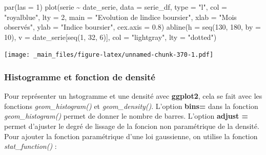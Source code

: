 \documentclass[
]{book}
\newenvironment{Shaded}{\begin{snugshade}}{\end{snugshade}}
\newcommand{\AttributeTok}[1]{\textcolor[rgb]{0.77,0.63,0.00}{#1}}
\newcommand{\DecValTok}[1]{\textcolor[rgb]{0.00,0.00,0.81}{#1}}
\newcommand{\FloatTok}[1]{\textcolor[rgb]{0.00,0.00,0.81}{#1}}
\newcommand{\FunctionTok}[1]{\textcolor[rgb]{0.00,0.00,0.00}{#1}}
\newcommand{\NormalTok}[1]{#1}
\newcommand{\SpecialCharTok}[1]{\textcolor[rgb]{0.00,0.00,0.00}{#1}}
\newcommand{\StringTok}[1]{\textcolor[rgb]{0.31,0.60,0.02}{#1}}
\theoremstyle{definition}
\theoremstyle{definition}
\theoremstyle{definition}
\theoremstyle{definition}
\theoremstyle{remark}
\begin{document}
\begin{Shaded}
\begin{Highlighting}[]
\FunctionTok{par}\NormalTok{(}\AttributeTok{las =} \DecValTok{1}\NormalTok{)}
\FunctionTok{plot}\NormalTok{(serie }\SpecialCharTok{\textasciitilde{}}\NormalTok{ date\_serie, }\AttributeTok{data =}\NormalTok{ serie\_df, }
     \AttributeTok{type =} \StringTok{"l"}\NormalTok{, }
     \AttributeTok{col =} \StringTok{"royalblue"}\NormalTok{, }
     \AttributeTok{lty =} \DecValTok{2}\NormalTok{,}
     \AttributeTok{main =} \StringTok{"Evolution de l\textquotesingle{}indice boursier"}\NormalTok{,}
     \AttributeTok{xlab =} \StringTok{"Mois observés"}\NormalTok{,}
     \AttributeTok{ylab =} \StringTok{"Indice boursier"}\NormalTok{,}
     \AttributeTok{cex.axis =} \FloatTok{0.8}\NormalTok{)}
\FunctionTok{abline}\NormalTok{(}\AttributeTok{h =} \FunctionTok{seq}\NormalTok{(}\DecValTok{130}\NormalTok{, }\DecValTok{180}\NormalTok{, }\AttributeTok{by =} \DecValTok{10}\NormalTok{), }
       \AttributeTok{v =}\NormalTok{ date\_serie[}\FunctionTok{seq}\NormalTok{(}\DecValTok{1}\NormalTok{, }\DecValTok{32}\NormalTok{, }\DecValTok{6}\NormalTok{)],}
       \AttributeTok{col =} \StringTok{"lightgray"}\NormalTok{, }\AttributeTok{lty =} \StringTok{"dotted"}\NormalTok{)}
\end{Highlighting}
\end{Shaded}

\texttt{[image: \_main\_files/figure-latex/unnamed-chunk-370-1.pdf]}

\hypertarget{histogramme-et-fonction-de-densituxe9}{%
\subsubsection{Histogramme et fonction de densité}\label{histogramme-et-fonction-de-densituxe9}}

Pour représenter un hstogramme et une densité avec \textbf{ggplot2}, cela se fait avec les fonctions \emph{geom\_histogram()} et \emph{geom\_density()}. L'option \textbf{bins=} dans la fonction \emph{geom\_histogram()} permet de donner le nombre de barres. L'option \textbf{adjust =} permet d'ajuster le degré de lissage de la foncion non paramétrique de la densité. Pour ajouter la fonction paramétrique d'une loi gaussienne, on utilise la fonction \emph{stat\_function()} :
\end{document}
